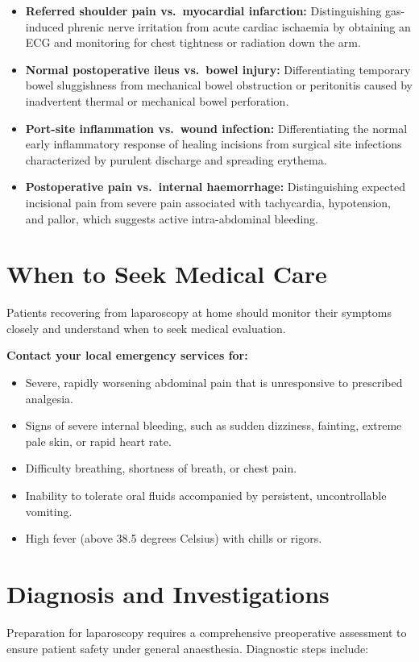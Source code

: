 \begin{itemize}
    \item \textbf{Referred shoulder pain vs.\ myocardial infarction:} Distinguishing gas-induced phrenic nerve irritation from acute cardiac ischaemia by obtaining an ECG and monitoring for chest tightness or radiation down the arm.
    \item \textbf{Normal postoperative ileus vs.\ bowel injury:} Differentiating temporary bowel sluggishness from mechanical bowel obstruction or peritonitis caused by inadvertent thermal or mechanical bowel perforation.
    \item \textbf{Port-site inflammation vs.\ wound infection:} Differentiating the normal early inflammatory response of healing incisions from surgical site infections characterized by purulent discharge and spreading erythema.
    \item \textbf{Postoperative pain vs.\ internal haemorrhage:} Distinguishing expected incisional pain from severe pain associated with tachycardia, hypotension, and pallor, which suggests active intra-abdominal bleeding.
\end{itemize}

\section*{When to Seek Medical Care}
Patients recovering from laparoscopy at home should monitor their symptoms closely and understand when to seek medical evaluation.

\textbf{Contact your local emergency services for:}
\begin{itemize}
    \item Severe, rapidly worsening abdominal pain that is unresponsive to prescribed analgesia.
    \item Signs of severe internal bleeding, such as sudden dizziness, fainting, extreme pale skin, or rapid heart rate.
    \item Difficulty breathing, shortness of breath, or chest pain.
    \item Inability to tolerate oral fluids accompanied by persistent, uncontrollable vomiting.
    \item High fever (above 38.5 degrees Celsius) with chills or rigors.
\end{itemize}

\section*{Diagnosis and Investigations}
Preparation for laparoscopy requires a comprehensive preoperative assessment to ensure patient safety under general anaesthesia. Diagnostic steps include:

